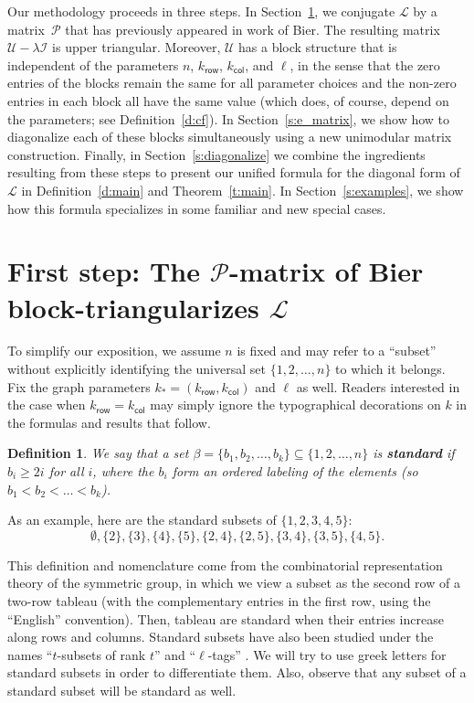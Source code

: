 \documentclass[11pt]{article}
\newtheorem{definition}[theo]{Definition}
\theoremstyle{definition}
\numberwithin{equation}{section}
\numberwithin{equation}{section}
\renewcommand{\L}{\mathcal{L}}
\renewcommand{\P}{\mathcal{P}}
\newcommand{\I}{\mathcal{I}}
\newcommand{\U}{\mathcal{U}}
\newcommand{\kr}{{k}_{\mathsf{row}}}
\newcommand{\kc}{{k}_{\mathsf{col}}}
\newcommand{\kk}{{k}_{\mathsf{*}}}
\begin{document}
Our methodology proceeds in three steps.  In Section~\ref{s:p_matrix}, we conjugate $\L$ by a matrix~$\P$ that has previously appeared in work of Bier.  The resulting matrix $\U - \lambda \I$ is upper triangular.  Moreover, $\U$ has a block structure that is independent of the parameters $n$, $\kr$, $\kc$, and $\ell$, in the sense that the zero entries of the blocks remain the same for all parameter choices and the non-zero entries in each block all have the same value (which does, of course, depend on the parameters; see Definition~\ref{d:cf}).  In Section~\ref{s:e_matrix}, we show how to diagonalize each of these blocks simultaneously using a new unimodular matrix construction.  Finally, in Section~\ref{s:diagonalize} we combine the ingredients resulting from these steps to present our unified formula for the diagonal form of $\L$ in Definition~\ref{d:main} and Theorem~\ref{t:main}.  In Section~\ref{s:examples}, we show how this formula specializes in some familiar and new special cases.



\section{First step:  The \texorpdfstring{$\P$}{P}-matrix of Bier block-triangularizes \texorpdfstring{$\L$}{L}}\label{s:p_matrix}

To simplify our exposition, we assume $n$ is fixed and may refer to a ``subset'' without explicitly identifying the universal set $\{1, 2, \ldots, n\}$ to which it belongs.  Fix the graph parameters $\kk = (\kr, \kc)$ and $\ell$ as well.  Readers interested in the case when $\kr = \kc$ may simply ignore the typographical decorations on $k$ in the formulas and results that follow.

\begin{definition}\label{d:standard}
We say that a set $\beta = \{b_1, b_2, \ldots, b_k\} \subseteq \{1, 2, \ldots, n\}$ is {\bf standard} if~$b_i \geq 2i$ for all $i$, where the $b_i$ form an ordered labeling of the elements (so $b_1 < b_2 < \ldots < b_k$).
\end{definition}

As an example, here are the standard subsets of $\{1, 2, 3, 4, 5\}$:
\[
\emptyset, \{2\}, \{3\}, \{4\}, \{5\}, \{2,4\}, \{2,5\}, \{3,4\}, \{3,5\}, \{4,5\}.
\]


This definition and nomenclature come from the combinatorial representation theory of the symmetric group, in which we view a subset as the second row of a two-row tableau (with the complementary entries in the first row, using the ``English'' convention).  Then, tableau are standard when their entries increase along rows and columns.  Standard subsets have also been studied under the names ``$t$-subsets of rank $t$'' \cite{frankl,bier} and ``$\ell$-tags'' \cite{singhi}.  We will try to use greek letters for standard subsets in order to differentiate them.  Also, observe that any subset of a standard subset will be standard as well.
\end{document}
